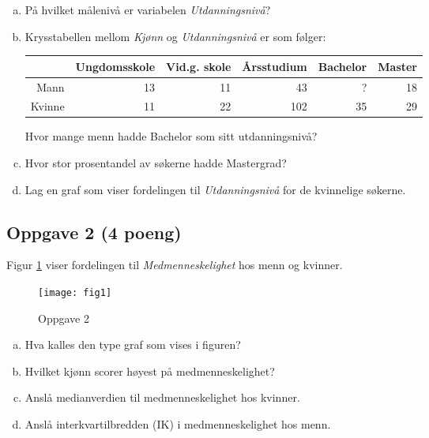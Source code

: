 \documentclass[12pt,a4paper, norsk]{article}
\begin{document}
 \begin{enumerate}[(a)]


\item På hvilket målenivå er variabelen {\it Utdanningsnivå}?


\item Krysstabellen mellom {\it Kjønn} og {\it Utdanningsnivå} er som følger:



\begin{table}[ht]
	\centering
	\begin{tabular}{rrrrrr}
 & Ungdomsskole & Vid.g. skole & Årsstudium & Bachelor & Master \\ 
  \hline
Mann &  13 &  11 &  43 &  ? &  18 \\ 
  Kvinne &  11 &  22 & 102 &  35 &  29 \\ 
   \hline
\end{tabular}
\end{table}

Hvor mange menn hadde Bachelor som sitt utdanningsnivå?

\item 
Hvor stor prosentandel av søkerne hadde Mastergrad?



\item Lag en graf som viser fordelingen til {\it Utdanningsnivå} for de kvinnelige søkerne.



	\end{enumerate}		

\subsection*{Oppgave 2  (4 poeng) }
Figur \ref{fig:1}  viser fordelingen til {\it Medmenneskelighet} hos menn og kvinner.
\begin{figure}[htp]
	\centering
	\texttt{[image: fig1]}
	\caption{Oppgave 2 }
	\label{fig:1}
\end{figure}

 \begin{enumerate}[(a)]

\item Hva kalles den type graf som vises i figuren? 


\item  Hvilket kjønn  scorer høyest på medmenneskelighet?

\item  Anslå medianverdien til medmenneskelighet hos kvinner.


\item  Anslå interkvartilbredden (IK) i medmenneskelighet hos menn. 





\end{enumerate}		
\end{document}

